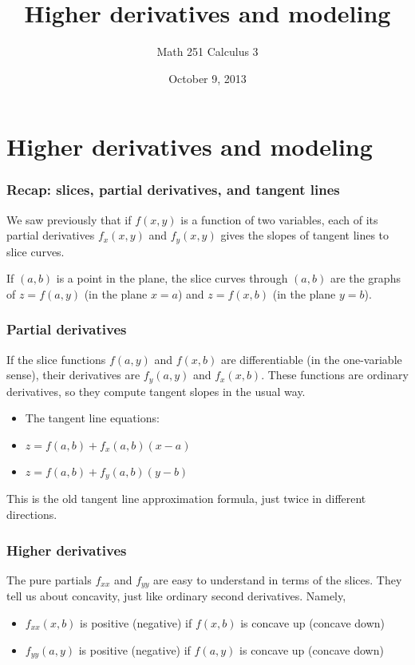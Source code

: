 \documentclass[11pt,ignorenonframetext,aspectratio=169,xcolor={svgnames}]{beamer}
\title{Higher derivatives and modeling}
\author{Math 251 Calculus 3}
\date{October 9, 2013}
\begin{document}
\frame{\titlepage}

\section{Higher derivatives and modeling}

\begin{frame}\frametitle{Recap: slices, partial derivatives, and tangent
lines}

We saw previously that if $f(x,y)$ is a function of two variables, each
of its partial derivatives $f_x(x,y)$ and $f_y(x,y)$ gives the slopes of
tangent lines to slice curves.

If $(a, b)$ is a point in the plane, the slice curves through $(a,b)$
are the graphs of $z = f(a, y)$ (in the plane $x = a$) and $z = f(x, b)$
(in the plane $y = b$).

\end{frame}

\begin{frame}\frametitle{Partial derivatives}

If the slice functions $f(a, y)$ and $f(x,b)$ are differentiable (in the
one-variable sense), their derivatives are $f_y(a,y)$ and $f_x(x,b)$.
These functions are ordinary derivatives, so they compute tangent slopes
in the usual way.

\begin{itemize}

\item
  The tangent line equations:
\item
  $z = f(a, b) + f_x(a,b)(x - a)$
\item
  $z = f(a, b) + f_y(a,b)(y - b)$
\end{itemize}

This is the old tangent line approximation formula, just twice in
different directions.

\end{frame}

\begin{frame}\frametitle{Higher derivatives}

The pure partials $f_{xx}$ and $f_{yy}$ are easy to understand in terms
of the slices. They tell us about concavity, just like ordinary second
derivatives. Namely,

\begin{itemize}

\item
  $f_{xx}(x,b)$ is positive (negative) if $f(x,b)$ is concave up
  (concave down)
\item
  $f_{yy}(a,y)$ is positive (negative) if $f(a,y)$ is concave up
  (concave down)
\end{itemize}

\end{frame}
\end{document}
